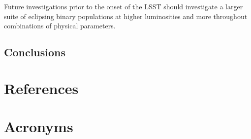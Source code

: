 \documentclass[DM,authoryear,toc]{lsstdoc}
\begin{document}
Future investigations prior to the onset of the LSST should investigate a larger suite of eclipsing binary populations at higher luminosities and more throughout  combinations of physical parameters.


\subsection{Conclusions}


\appendix
\section{References} \label{sec:bib}


\section{Acronyms} \label{sec:acronyms}

\end{document}
